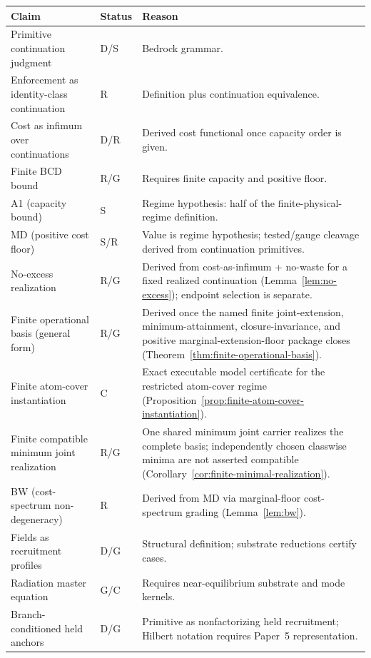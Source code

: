 \documentclass[11pt]{article}
\theoremstyle{remark}
\newcommand{\Status}[1]{\textsf{#1}}
\begin{document}
\begin{center}
\begin{longtable}{p{}p{}p{}}
\toprule
\textbf{Claim} & \textbf{Status} & \textbf{Reason}\\
\midrule
Primitive continuation judgment & \Status{D/S} & Bedrock grammar.\\
Enforcement as identity-class continuation & \Status{R} & Definition plus continuation equivalence.\\
Cost as infimum over continuations & \Status{D/R} & Derived cost functional once capacity order is given.\\
Finite BCD bound & \Status{R/G} & Requires finite capacity and positive floor.\\
A1 (capacity bound) & \Status{S} & Regime hypothesis: half of the finite-physical-regime definition.\\
MD (positive cost floor) & \Status{S/R} & Value is regime hypothesis; tested/gauge cleavage derived from continuation primitives.\\
No-excess realization & \Status{R/G} & Derived from cost-as-infimum + no-waste for a fixed realized continuation (Lemma~\ref{lem:no-excess}); endpoint selection is separate.\\
Finite operational basis (general form) & \Status{R/G} & Derived once the named finite joint-extension, minimum-attainment, closure-invariance, and positive marginal-extension-floor package closes (Theorem~\ref{thm:finite-operational-basis}).\\
Finite atom-cover instantiation & \Status{C} & Exact executable model certificate for the restricted atom-cover regime (Proposition~\ref{prop:finite-atom-cover-instantiation}).\\
Finite compatible minimum joint realization & \Status{R/G} & One shared minimum joint carrier realizes the complete basis; independently chosen classwise minima are not asserted compatible (Corollary~\ref{cor:finite-minimal-realization}).\\
BW (cost-spectrum non-degeneracy) & \Status{R} & Derived from MD via marginal-floor cost-spectrum grading (Lemma~\ref{lem:bw}).\\
Fields as recruitment profiles & \Status{D/G} & Structural definition; substrate reductions certify cases.\\
Radiation master equation & \Status{G/C} & Requires near-equilibrium substrate and mode kernels.\\
Branch-conditioned held anchors & \Status{D/G} & Primitive as nonfactorizing held recruitment; Hilbert notation requires Paper~5 representation.\\

\end{longtable}
\end{center}
\end{document}
